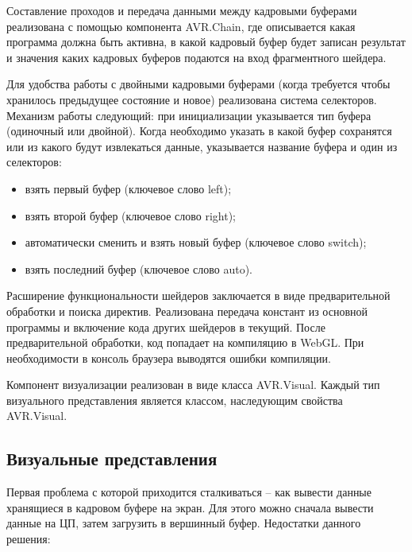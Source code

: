 Составление проходов и передача данными между кадровыми буферами реализована с помощью
компонента AVR.Chain, где описывается какая программа должна быть активна, в какой
кадровый буфер будет записан результат и значения каких кадровых буферов подаются на вход
фрагментного шейдера.

Для удобства работы с двойными кадровыми буферами (когда требуется чтобы хранилось предыдущее
состояние и новое) реализована система селекторов. Механизм работы следующий: при инициализации
указывается тип буфера (одиночный или двойной). Когда необходимо указать в какой буфер сохранятся 
или из какого будут извлекаться данные, указывается название буфера и один из селекторов:

\begin{itemize}
  \item взять первый буфер (ключевое слово left);
  \item взять второй буфер (ключевое слово right);
  \item автоматически сменить и взять новый буфер (ключевое слово switch);
  \item взять последний буфер (ключевое слово auto).
\end{itemize}

Расширение функциональности шейдеров заключается в виде предварительной обработки
и поиска директив. Реализована передача констант из основной программы и включение
кода других шейдеров в текущий. После предварительной обработки, код попадает на компиляцию
в WebGL. При необходимости в консоль браузера выводятся ошибки компиляции.

Компонент визуализации реализован в виде класса AVR.Visual. Каждый тип визуального представления
является классом, наследующим свойства AVR.Visual.

\subsection{Визуальные представления}


Первая проблема с которой приходится сталкиваться -- как вывести данные хранящиеся в кадровом
буфере на экран. Для этого можно сначала вывести данные на ЦП, затем загрузить в вершинный буфер.
Недостатки данного решения:

